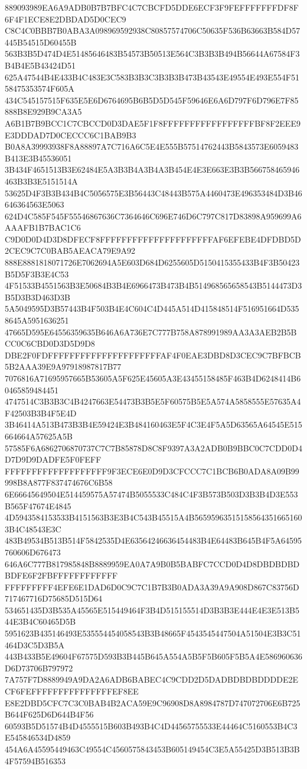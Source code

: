 {{{{{{{{{{{{{{{{{{{{{889093989EA6A9ADB0B7B7BFC4C7CBCFD5DDE6ECF3F9FEFFFFFFFDF8F6F4F1ECE8E2DBDAD5D0CEC9
C8C4C0BBB7B0ABA3A098969592938C80857574706C50635F536B63663B584D57445B54515D60455B
563B3B5D474D4E51485646483B54573B50513E564C3B3B3B494B56644A67584F3B4B4E5B43424D51
625A47544B4E433B4C483E3C583B3B3C3B3B3B473B43543E49554E493E554F5158475353574F605A
434C545157515F635E5E6D6764695B6B5D5D545F59646E6A6D797F6D796E7F85888B8E929B9CA3A5
A6B1B7B9BCC1C7CBCCD0D3DAE5F1F8FFFFFFFFFFFFFFFFFBF8F2EEE9E3DDDAD7D0CECCC6C1BAB9B3
B0A8A39993938F8A88897A7C716A6C5E4E555B57514762443B5843573E6059483B413E3B45536051
3B434F4651513B3E62484E5A3B3B4A3B4A3B454E4E3E663E3B3B566758465946463B3B3E5151514A
53625D4F3B3B434B4C5056575E3B56443C48443B575A4460473E496353484D3B46646364563E5063
624D4C585F545F55546867636C7364646C696E746D6C797C817D83898A959699A6AAAFB1B7BAC1C6
C9D0D0D4D3D8DFECF8FFFFFFFFFFFFFFFFFFFFFAF6EFEBE4DFDBD5D2CEC9C7C0BAB5AEACA79E9A92
888E8881818071726E7062694A5E603D684D6255605D5150415355433B4F3B50423B5D5F3B3E4C53
4F51533B4551563B3E50684B3B4E6966473B473B4B514968565658543B5144473D3B5D3B3D463D3B
5A5049595D3B57443B4F503B4E4C604C4D445A514D415848514F516951664D5358645A5951636251
47665D595E64556359635B646A6A736E7C777B758A878991989AA3A3AEB2B5BCC0C6CBD0D3D5D9D8
DBE2F0FDFFFFFFFFFFFFFFFFFFFFFAF4F0EAE3DBD8D3CEC9C7BFBCB5B2AAA39E9A97918987817B77
7076816A71695957665B53605A5F625E45605A3E43455158485F463B4D6248414B60465859484451
4747514C3B3B3C4B4247663E54473B3B5E5F60575B5E5A574A5858555E57635A4F42503B3B4F5E4D
3B46414A513B473B3B4E59424E3B484160463E5F4C3E4F5A5D63565A64545E515664664A57625A5B
57585F6A6862706870737C7C7B85878D8C8F9397A3A2ADB0B9BBC0C7CDD0D4D7D9D9DADFE5F0FEFF
FFFFFFFFFFFFFFFFFFF9F3ECE6E0D9D3CFCCC7C1BCB6B0ADA8A09B99998B8A877F837474676C6B58
6E66645649504E514459575A57474B5055533C484C4F3B573B503D3B3B4D3E553B565F47674E4845
4D5943584153533B4151563B3E3B4C543B45515A4B565959635151585643516651603B4C48543E3C
483B49534B513B514F5842535D4E63564246636454483B4E64483B645B4F5A64595760606D676473
646A6C777B817985848B8889959EA0A7A9B0B5BABFC7CCD0D4D8DBDBDBDBDFE6F2FBFFFFFFFFFFFF
FFFFFFFFF4EFE6E1DAD6D0C9C7C1B7B3B0ADA3A39A9A908D867C83756D717467716D75685D515D64
534651435D3B535A45565E515449464F3B4D515155514D3B3B3E444E4E3E513B544E3B4C60465D5B
5951623B435146493E535554454058543B3B48665F4543545447504A51504E3B3C51464D3C5D3B5A
443B433B5E49604F67575D593B3B445B645A554A5B5F5B605F5B5A4E586960636D6D73706B797972
7A757F7D8889949A9DA2A6ADB6BABEC4C9CDD2D5DADBDBDBDDDDE2ECF6FEFFFFFFFFFFFFFFFEF8EE
E8E2DBD5CFC7C3C0BAB4B2ACA59E9C96908D8A8984787D747072706E6B725B644F625D6D644B4F56
60593B5D51574B4D4555515B603B493B4C4D44565755533E44464C5160553B4C3E545846534D4859
454A6A45595449463C49554C4560575843453B605149454C3E5A55425D3B513B3B4F57594B516353
}}}}}}}}}}}}}}}}}}}}}
